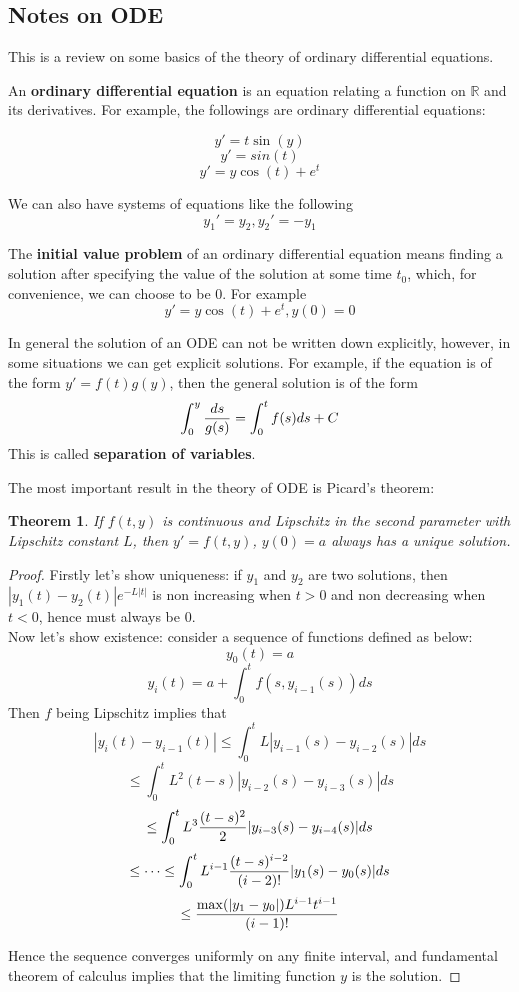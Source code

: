 \documentclass{article} %
\theoremstyle{break}
\newtheorem{thm}[definition]{Theorem}
\begin{document}
\subsection{Notes on ODE}

This is a review on some basics of the theory of ordinary differential equations.

An {\bf ordinary differential equation} is an equation relating a function on $\mathbb{R}$ and its derivatives. For example, the followings are ordinary differential equations:

\[y'=t\sin(y)\]
\[y'=sin(t)\]
\[y'=y\cos(t)+e^t\]

We can also have systems of equations like the following
\[y_1'=y_2, y_2'=-y_1\]


The {\bf initial value problem} of an ordinary differential equation means finding a solution after specifying the value of the solution at some time $t_0$, which, for convenience, we can choose to be $0$. For example
\[y'=y\cos(t)+e^t, y(0)=0\]

In general the solution of an ODE can not be written down explicitly, however, in some situations we can get explicit solutions. For example, if the equation is of the form $y'=f(t)g(y)$, then the general solution is of the form
\[\int_0^y {ds\over g(s)}=\int_0^t f(s)ds+C\]
This is called {\bf separation of variables}.

The most important result in the theory of ODE is Picard's theorem:

\begin{thm}
If $f(t, y)$ is continuous and Lipschitz in the second parameter with Lipschitz constant $L$, then $y'=f(t, y)$, $y(0)=a$ always has a unique solution.
\end{thm}

\begin{proof}
 Firstly let's show uniqueness: if $y_1$ and $y_2$ are two solutions, then $|y_1(t)-y_2(t)|e^{-L|t|}$ is non increasing when $t>0$ and non decreasing when $t<0$, hence must always be $0$.\\
  
  Now let's show existence: consider a sequence of functions defined as below:
  \[y_0(t)=a\]
  \[y_i(t)=a+\int_0^t f(s, y_{i-1}(s))ds\]
  Then $f$ being Lipschitz implies that
  \[|y_i(t)-y_{i-1}(t)|\leq \int_0^t L|y_{i-1}(s)-y_{i-2}(s)|ds\]
  \[\leq \int_0^t L^2(t-s)|y_{i-2}(s)-y_{i-3}(s)|ds\]
  \[\leq \int_0^t L^3{(t-s)^2\over 2}|y_{i-3}(s)-y_{i-4}(s)|ds\]
  \[\leq \dots \leq \int_0^t L^{i-1}{(t-s)^{i-2}\over (i-2)!}|y_1(s)-y_0(s)|ds\]
  \[\leq {\max(|y_1-y_0|)L^{i-1}t^{i-1}\over (i-1)!}\]

  Hence the sequence converges uniformly on any finite interval, and fundamental theorem of calculus implies that the limiting function $y$ is the solution.
\end{proof}
\end{document}
